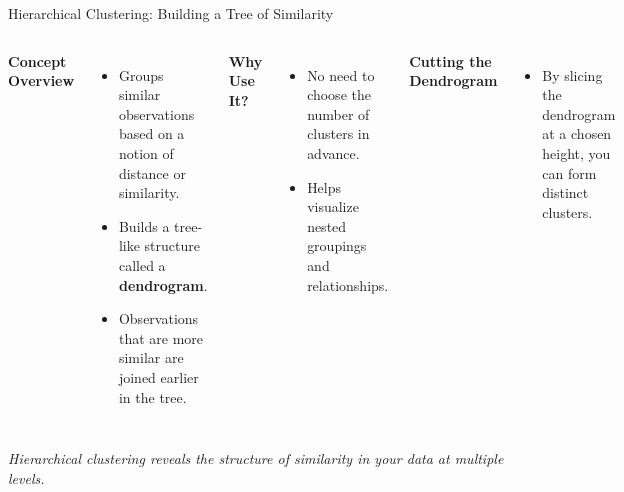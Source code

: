 \documentclass[aspectratio=169,xcolor=dvipsnames]{beamer}
\begin{document}
\begin{frame}{Hierarchical Clustering: Building a Tree of Similarity}
  \begin{columns}
    \textbf{Concept Overview}
    \begin{itemize}
      \item Groups similar observations based on a notion of distance or similarity.
      \item Builds a tree-like structure called a \textbf{dendrogram}.
      \item Observations that are more similar are joined earlier in the tree.
    \end{itemize}

    \vspace{0.3cm}
    \textbf{Why Use It?}
    \begin{itemize}
      \item No need to choose the number of clusters in advance.
      \item Helps visualize nested groupings and relationships.
    \end{itemize}


    \vspace{0.3cm}
    \textbf{Cutting the Dendrogram}
    \begin{itemize}
      \item By slicing the dendrogram at a chosen height, you can form distinct clusters.
    \end{itemize}
  \end{columns}

  \vspace{0.4cm}
  \centering
  \textit{Hierarchical clustering reveals the structure of similarity in your data at multiple levels.}
\end{frame}
\end{document}
